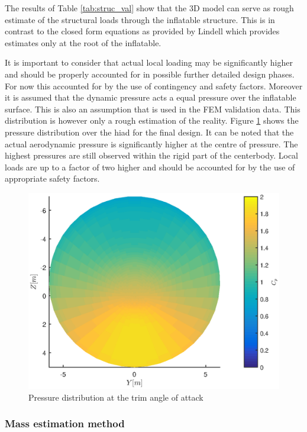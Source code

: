 The results of Table \ref{tab:struc_val} show that the 3D model can serve as rough estimate of the structural loads through the inflatable structure. This is in contrast to the closed form equations as provided by Lindell \cite{Lindell2006} which provides estimates only at the root of the inflatable. 

It is important to consider that actual local loading may be significantly higher and should be properly accounted for in possible further detailed design phases. For now this accounted for by the use of contingency and safety factors. Moreover it is assumed that the dynamic pressure acts a equal pressure over the inflatable surface. This is also an assumption that is used in the FEM validation data. This distribution is however only a rough estimation of the reality. Figure \ref{fig:struc_pres} shows the pressure distribution over the \gls{hiad} for the final design. It can be noted that the actual aerodynamic pressure is significantly higher at the centre of pressure. The highest pressures are still observed within the rigid part of the centerbody. Local loads are up to a factor of two higher and should be accounted for by the use of appropriate safety factors.

\begin{figure}[h]
\centering
\includegraphics[width=1\textwidth]{./Figure/Structure/FrontviewCpDist}
\caption{Pressure distribution at the trim angle of attack} 
\label{fig:struc_pres}
\end{figure}

\subsubsection{Mass estimation method}

